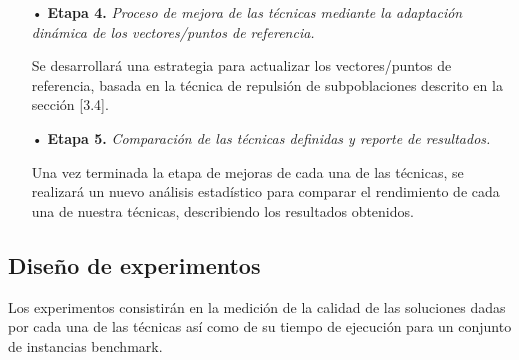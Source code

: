 \documentclass[letterpaper,10pt]{article}
\begin{document}
\begin{itemize}
\item[•] \textbf{Etapa 4.} \emph{Proceso de mejora de las técnicas mediante la adaptación dinámica de los vectores/puntos de referencia.}

\item[] Se desarrollará una estrategia para actualizar los vectores/puntos de referencia, basada en la técnica de repulsión de subpoblaciones descrito en la sección [3.4].

\item[•] \textbf{Etapa 5.} \emph{Comparación de las técnicas definidas y reporte de resultados.}

\item[] Una vez terminada la etapa de mejoras de cada una de las técnicas, se realizará un nuevo análisis estadístico para comparar el rendimiento de cada una de nuestra técnicas, describiendo los resultados obtenidos.
        
  \end{itemize}

\subsection{\textbf{Diseño de experimentos}}
Los experimentos consistirán en la medición de la calidad de las soluciones dadas por cada una de las técnicas así como de su tiempo de ejecución para un conjunto de instancias benchmark.
         
\end{document}
